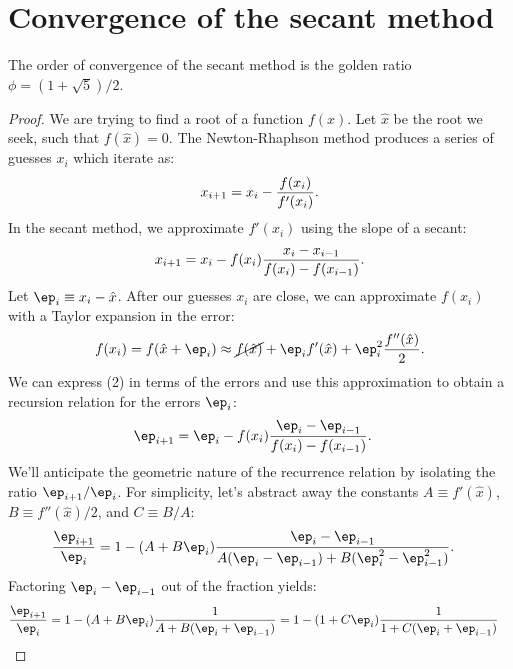 \documentclass{article}
\begin{document}
\section{Convergence of the secant method}

\begin{prop}
    The order of convergence of the secant method is the golden ratio
    $\phi = (1 + \sqrt5)/2$.
\end{prop}

\begin{proof}
We are trying to find a root of a function $f(x)$. Let $\hat x$ be the
root we seek, such that $f(\hat x) = 0$. The Newton-Rhaphson method produces
a series of guesses $x_i$ which iterate as:
\begin{align}
    x_{i+1} = x_i - {f(x_i) \over f'(x_i)}.
\end{align}
In the secant method, we approximate $f'(x_i)$ using the slope of a secant:
\begin{align}
    x_{i+1} = x_i - f(x_i) {x_i - x_{i-1} \over f(x_i) - f(x_{i-1})}.
\end{align}
Let $\ep_i \equiv x_i - \hat x$. After our guesses $x_i$ are close, we can
approximate $f(x_i)$ with a Taylor expansion in the error:
\begin{align}
    f(x_i) = f(\hat x + \ep_i)
    \approx \cancel{f(\hat x)} + \ep_i f'(\hat x)
    + \ep_i^2 {f''(\hat x) \over 2}.
\end{align}
We can express (2) in terms of the errors and use this approximation to
obtain a recursion relation for the errors $\ep_i$:
\begin{align}
    \ep_{i+1} &= \ep_i - f(x_i) {\ep_i - \ep_{i-1} \over f(x_i) - f(x_{i-1})}.
\end{align}
We'll anticipate
the geometric nature of the recurrence relation by isolating the ratio
$\ep_{i + 1} / \ep_i$.
For simplicity, let's abstract away the constants
$A \equiv f'(\hat x)$, $B \equiv f''(\hat x) / 2$, and $C \equiv B/A$:
\begin{align}
    {\ep_{i+1} \over \ep_i} &=
    1 - (A + B\ep_i)
    {
        \ep_i - \ep_{i-1}
        \over
        A(\ep_i - \ep_{i-1}) + B(\ep_i^2 - \ep_{i-1}^2)
    }.
\end{align}
Factoring $\ep_i - \ep_{i-1}$ out of the fraction yields:
\begin{align}
    {\ep_{i+1} \over \ep_i} &=
    1 - (A + B\ep_i)
    {
        1
        \over
        A + B(\ep_i + \ep_{i-1})
    }
    = 1 - (1 + C\ep_i)
    {
        1
        \over
        1 + C(\ep_i + \ep_{i-1})
}
\end{align}
\end{proof}
\end{document}
